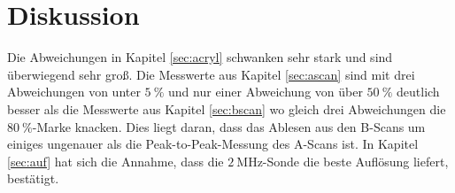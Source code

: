 \section{Diskussion}

Die Abweichungen in Kapitel \ref{sec:acryl} schwanken sehr stark und sind überwiegend sehr groß. Die Messwerte aus Kapitel \ref{sec:ascan}
sind mit drei Abweichungen von unter $\SI{5}{\%}$ und nur einer Abweichung von über $\SI{50}{\%}$ deutlich besser als die Messwerte aus
Kapitel \ref{sec:bscan} wo gleich drei Abweichungen die $\SI{80}{\%}$-Marke knacken. Dies liegt daran, dass das Ablesen aus den B-Scans
um einiges ungenauer als die Peak-to-Peak-Messung des A-Scans ist.
In Kapitel \ref{sec:auf} hat sich die Annahme, dass die $\SI{2}{\MHz}$-Sonde die beste Auflösung liefert, bestätigt.
